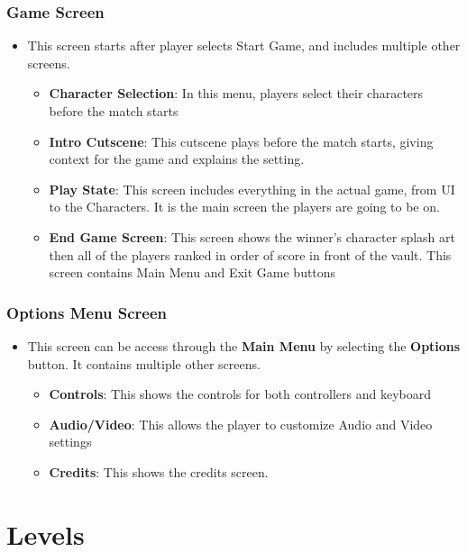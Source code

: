 \documentclass[10pt]{report}
\begin{document}
\subsection{Game Screen}

\begin{itemize}
    \item This screen starts after player selects Start Game, and includes multiple other screens.
    \begin{itemize}    
        \item \textbf{Character Selection}: In this menu, players select their characters before the match starts
        \item \textbf{Intro Cutscene}: This cutscene plays before the match starts, giving context for the game and explains the setting.
        \item \textbf{Play State}: This screen includes everything in the actual game, from UI to the Characters. It is the main screen the players are going to be on.
        \item \textbf{End Game Screen}: This screen shows the winner’s character splash art then all of the players ranked in order of score in front of the vault. This screen contains Main Menu and Exit Game buttons
    \end{itemize}
\end{itemize}

\subsection{Options Menu Screen}
\begin{itemize}
    \item This screen can be access through the \textbf{Main Menu} by selecting the \textbf{Options} button. It contains multiple other screens.
    \begin{itemize}
        \item \textbf{Controls}: This shows the controls for both controllers and keyboard
        \item \textbf{Audio/Video}: This allows the player to customize Audio and Video settings
        \item \textbf{Credits}: This shows the credits screen.    
    \end{itemize}
\end{itemize}

\chapter{Levels}
\end{document}

